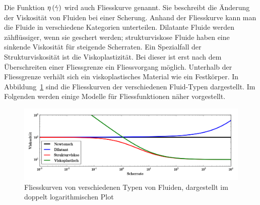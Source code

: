 Die Funktion $\eta\left( \dot\gamma \right)$ wird auch Fliesskurve genannt. Sie beschreibt die Änderung der Viskosität von Fluiden bei einer Scherung.
Anhand der Fliesskurve kann man die Fluide in verschiedene Kategorien unterteilen. Dilatante Fluide werden zähflüssiger, wenn sie geschert werden; strukturviskose Fluide haben eine sinkende Viskosität für steigende Scherraten.
Ein Spezialfall der Strukturviskosität ist die Viskoplastizität. Bei dieser ist erst nach dem Überschreiten einer Fliessgrenze ein Fliessvorgang möglich. Unterhalb der Fliessgrenze verhält sich ein viskoplastisches Material wie ein Fest\-körper.
In Abbildung~\ref{fig:fliessKurven} sind die Fliesskurven der verschiedenen Fluid-Typen dargestellt. Im Folgenden werden einige Modelle für Fliessfunktionen näher vorgestellt. 
%
\begin{figure}
    \centering
    \includegraphics[width=\textwidth]{figures/Fliesskurven.png}
    \caption{Fliesskurven von verschiedenen Typen von Fluiden, dargestellt im doppelt logarithmischen Plot}
    \label{fig:fliessKurven}
\end{figure}
%
